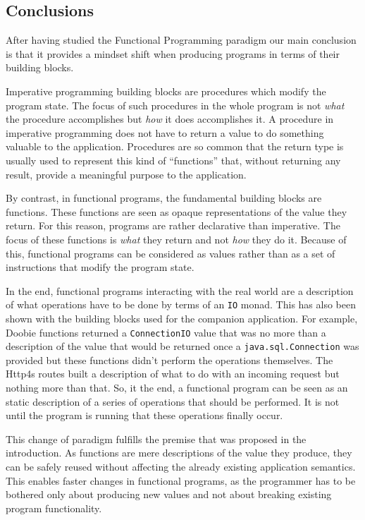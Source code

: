 \documentclass[../main.tex]{subfiles}
\begin{document}
\subsection{Conclusions}
After having studied the Functional Programming paradigm our main conclusion is
that it provides a mindset shift when producing programs in terms of their
building blocks.

Imperative programming building blocks are procedures which modify the program
state. The focus of such procedures in the whole program is not \textit{what} the
procedure accomplishes but \textit{how} it does accomplishes it. A procedure in
imperative programming does not have to return a value to do something valuable
to the application. Procedures are so common that the  return type is usually used to
represent this kind of ``functions'' that, without returning any result, provide a
meaningful purpose to the application.

By contrast, in functional programs, the fundamental building blocks are functions. These
functions are seen as opaque representations of the value they return. For this
reason, programs are rather declarative than imperative. The focus of these
functions is \textit{what} they return and not \textit{how} they do it. Because of this,
functional programs can be considered as values rather than as a set of
instructions that modify the program state.

In the end, functional programs interacting with the real world 
are a description of what operations have to
be done by terms of an \texttt{IO} monad. This has also been shown with the
building blocks used for the companion application. For example, Doobie functions
returned a \texttt{ConnectionIO} value that was no more than a description of
the value that would be returned once a \texttt{java.sql.Connection} was
provided but these functions didn't perform the operations themselves. The Http4s routes built a
description of what to do with an incoming request but nothing more than that. So,
it the end, a functional program can be seen as an static description of a series of
operations that should be performed. It is not until the program is running that these
operations finally occur.

This change of paradigm fulfills  the premise that was proposed in the introduction. As
functions are mere descriptions of the value they produce, they can be safely
reused without affecting the already existing application semantics. This enables
faster changes in functional programs, as the programmer has to be bothered
only about producing new values and not about breaking existing program
functionality.
\end{document}
